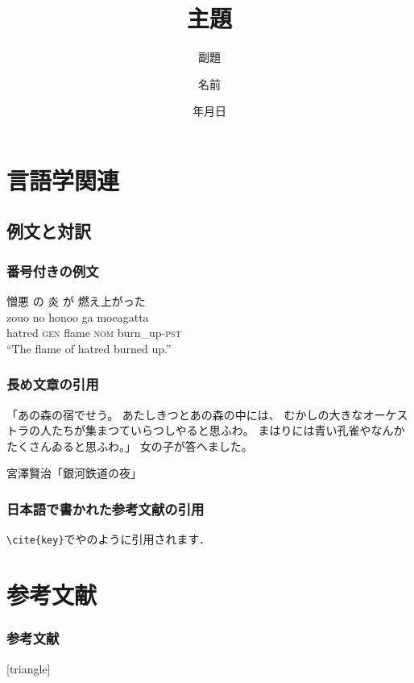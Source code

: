 \documentclass[11pt]{beamer}
\title{主題}
\subtitle{副題}
\institute{所属}
\author{名前}
\date{{\number\year}年{\number\month}月{\number\day}日}
\begin{document}
\begin{frame}
    \nocite{demo}
    \maketitle
\end{frame}

\section{言語学関連}
\subsection{例文と対訳}
\begin{frame}
\frametitle{番号付きの例文}
    \begin{exe}
        \ex%
        \glll%
        {憎悪} {の} {炎} {が} {燃え上がった} \\
        {zouo} {no} {honoo} {ga} {moeagatta} \\
        {hatred} {\textsc{gen}} {flame} {\textsc{nom}} {burn\_up-\textsc{pst}} \\
        \trans%
        ``The flame of hatred burned up.''
    \end{exe}
\end{frame}

\begin{frame}
    \frametitle{長め文章の引用}
    \begin{leftbar}
        「あの森の宿でせう。
        あたしきつとあの森の中には、
        むかしの大きなオーケストラの人たちが集まつていらつしやると思ふわ。
        まはりには青い孔雀やなんかたくさんゐると思ふわ。」
        女の子が答へました。

        \hfill 宮澤賢治「銀河鉄道の夜」
    \end{leftbar}
\end{frame}

\begin{frame}
\frametitle{日本語で書かれた参考文献の引用}
\texttt{{\textbackslash}cite\{key\}}で\cite{demo}や\cite{japanese}のように引用されます．
\end{frame}

\section{参考文献}
\begin{frame}[allowframebreaks]
\frametitle{参考文献}
\begingroup
\scriptsize
    [triangle]
    
    
\endgroup
\end{frame}
\end{document}
